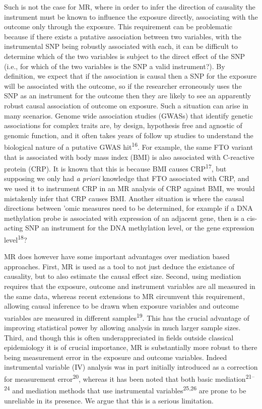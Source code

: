 \documentclass[]{article}
\begin{document}
Such is not the case for MR, where in order to infer the direction of
causality the instrument must be known to influence the exposure
directly, associating with the outcome only through the exposure. This
requirement can be problematic because if there exists a putative
association between two variables, with the instrumental SNP being
robustly associated with each, it can be difficult to determine which of
the two variables is subject to the direct effect of the SNP (i.e., for
which of the two variables is the SNP a valid instrument?). By
definition, we expect that if the association is causal then a SNP for
the exposure will be associated with the outcome, so if the researcher
erroneously uses the SNP as an instrument for the outcome then they are
likely to see an apparently robust causal association of outcome on
exposure. Such a situation can arise in many scenarios. Genome wide
association studies (GWASs) that identify genetic associations for
complex traits are, by design, hypothesis free and agnostic of genomic
function, and it often takes years of follow up studies to understand
the biological nature of a putative GWAS hit\textsuperscript{16}. For
example, the same FTO variant that is associated with body mass index
(BMI) is also associated with C-reactive protein (CRP). It is known that
this is because BMI causes CRP\textsuperscript{17}, but supposing we
only had \emph{a priori} knowledge that FTO associated with CRP, and we
used it to instrument CRP in an MR analysis of CRP against BMI, we would
mistakenly infer that CRP causes BMI. Another situation is where the
causal directions between 'omic measures need to be determined, for
example if a DNA methylation probe is associated with expression of an
adjacent gene, then is a cis-acting SNP an instrument for the DNA
methylation level, or the gene expression level\textsuperscript{18}?

MR does however have some important advantages over mediation based
approaches. First, MR is used as a tool to not just deduce the existance
of causality, but to also estimate the causal effect size. Second, using
mediation requires that the exposure, outcome and instrument variables
are all measured in the same data, whereas recent extensions to MR
circumvent this requirement, allowing causal inference to be drawn when
exposure variables and outcome variables are measured in different
samples\textsuperscript{19}. This has the crucial advantage of improving
statistical power by allowing analysis in much larger sample sizes.
Third, and though this is often underappreciated in fields outside
classical epidemiology it is of crucial importance, MR is substantially
more robust to there being measurement error in the exposure and outcome
variables. Indeed instrumental variable (IV) analysis was in part
initially introduced as a correction for measurement
error\textsuperscript{20}, whereas it has been noted that both basic
mediation\textsuperscript{21--24} and mediation methods that use
instrumental variables\textsuperscript{25,26} are prone to be unreliable
in its presence. We argue that this is a serious limitation.
\end{document}
